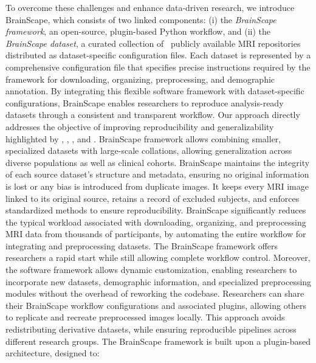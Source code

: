 To overcome these challenges and enhance data-driven research, we introduce BrainScape,
which consists of two linked components: 
(i) the \emph{BrainScape framework}, an open-source, plugin-based Python workflow, and 
(ii) the \emph{BrainScape dataset}, a curated collection of \NumDatasets\ publicly available MRI repositories distributed as dataset-specific configuration files.
Each dataset is represented by a comprehensive configuration file that specifies precise instructions 
required by the framework for downloading, organizing, preprocessing, and demographic annotation. 
By integrating this flexible software framework with dataset-specific configurations, 
BrainScape enables researchers to reproduce analysis-ready datasets through a consistent and transparent workflow.
Our approach directly addresses the objective of improving reproducibility and 
generalizability highlighted by \cite{marek2024replicability}, \cite{yang2024limits}, \cite{kiar2024experimental}, and \cite{adkinson2024brain}. 
BrainScape framework allows combining smaller, specialized datasets with large-scale collations, 
allowing generalization across diverse populations as well as clinical cohorts. 
BrainScape maintains the integrity of each source dataset's structure and metadata, ensuring no original information is lost or any bias is introduced from duplicate images. 
It keeps every MRI image linked to its original source, retains a record of excluded subjects, 
and enforces standardized methods to ensure reproducibility. 
BrainScape significantly reduces the typical workload associated with downloading, 
organizing, and preprocessing MRI data from thousands of participants, 
by automating the entire workflow for integrating and preprocessing datasets. 
The BrainScape framework offers researchers a rapid start while still allowing complete workflow control.
Moreover, the software framework allows dynamic customization, enabling researchers to incorporate new datasets, demographic information, 
and specialized preprocessing modules without the overhead of reworking the codebase.
Researchers can share their BrainScape workflow configurations and associated plugins, 
allowing others to replicate and recreate preprocessed images locally. 
This approach avoids redistributing derivative datasets, 
while ensuring reproducible pipelines across different research groups. 
The BrainScape framework is built upon a plugin-based architecture, designed to:

